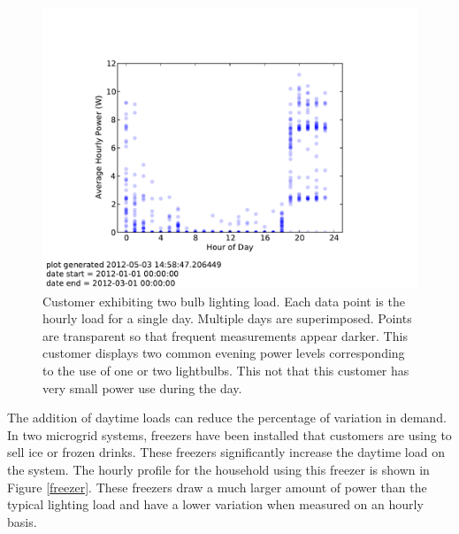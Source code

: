 \documentclass[conference]{IEEEtran}
\begin{document}
\begin{figure}[h]
\begin{center}
\includegraphics[trim = 0.7in 0.8in 0.7in 1.1in, clip, width=\columnwidth]
{figures/two_bulb_profile.pdf}
\end{center}
\caption{Customer exhibiting two bulb lighting load.
Each data point is the hourly load for a single day.
Multiple days are superimposed.
Points are transparent so that frequent measurements appear darker.
This customer displays two common evening power levels corresponding
to the use of one or two lightbulbs.
This not that this customer has very small power use during the day.}
\label{two-bulb-profile}
\end{figure}

The addition of daytime loads can reduce the percentage of variation
in demand.
In two microgrid systems, freezers have been installed that customers are using to
sell ice or frozen drinks.
These freezers significantly increase the daytime load on the system.
The hourly profile for the household using this freezer
is shown in Figure \ref{freezer}.
These freezers draw a much larger amount of power than the
typical lighting load and have a lower variation when measured
on an hourly basis.
\end{document}
